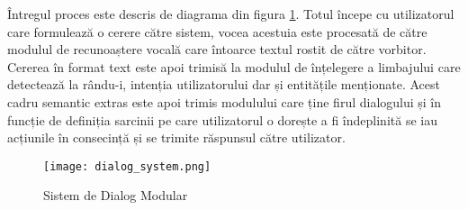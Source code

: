 Întregul proces este descris de diagrama din figura \ref{fig:ds_proc}. Totul începe cu utilizatorul care formulează o cerere către sistem, vocea acestuia este procesată de către modulul de recunoaștere vocală care întoarce textul rostit de către vorbitor. Cererea în format text este apoi trimisă la modulul de înțelegere a limbajului care detectează la rându-i, intenția utilizatorului dar și entitățile menționate. Acest cadru semantic extras este apoi trimis modulului care ține firul dialogului și în funcție de definiția sarcinii pe care utilizatorul o dorește a fi îndeplinită se iau acțiunile în consecință și se trimite răspunsul către utilizator.

\begin{figure}[h]
	\texttt{[image: dialog\_system.png]}
	\caption{Sistem de Dialog Modular}
	\label{fig:ds_proc}
\end{figure}